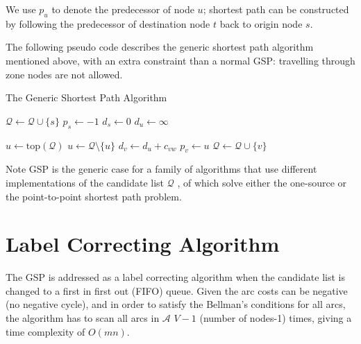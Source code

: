 We use $p_u$ to denote the predecessor of node $u$;
shortest path can be constructed by following the predecessor of destination node $t$ back to origin node $s$.

The following pseudo code describes the generic shortest path algorithm mentioned above,
with an extra constraint than a normal GSP: travelling through zone nodes are not allowed.
\begin{algorithm}
    \caption{The Generic Shortest Path Algorithm \citep{Klunder}}
    \begin{algorithmic}[1]
        \State $\mathcal{Q} \gets \mathcal{Q} \cup \{s\}$ 
        \State $p_s \gets -1$ 
        \State $d_s \gets 0$
         
            \State $d_u \gets \infty$
        \EndFor

        \State $ u \gets \text{top}(\mathcal{Q}) $ 
        \State $ u \gets \mathcal{Q} \setminus \{u\} $
             
                        \State $d_v \gets d_u + c_{vw}$
                        \State $p_v \gets u$
                         
                        \State $\mathcal{Q} \gets \mathcal{Q} \cup \{v\}$
                        \EndIf
                    \EndIf
                \EndFor
            \EndIf
        \EndWhile
        \EndProcedure
    \end{algorithmic}
\end{algorithm}

Note GSP is the generic case for a family of algorithms
that use different implementations of the candidate list $\mathcal{Q}$ \citep{mplomer},
of which solve either the one-source or the point-to-point shortest path problem.

\section{Label Correcting Algorithm}
\label{section:labelcorrectingalgorithm}
The GSP is addressed as a label correcting algorithm when the candidate list is changed to
a first in first out (FIFO) queue.
Given the arc costs can be negative (no negative cycle),
and in order to satisfy the Bellman's conditions for all arcs,
the algorithm has to scan all arcs in $\mathcal{A}$ $V-1$ (number of nodes-1) times,
giving a time complexity of $O(mn)$.


